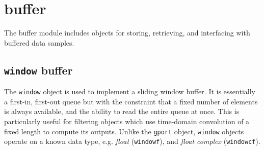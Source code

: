 % 
%

\newpage
\section{buffer}
\label{module:buffer}
The buffer module includes objects for storing, retrieving, and
interfacing with buffered data samples.


\subsection{{\tt window} buffer}
\label{module:buffer:window}
The {\tt window} object is used to implement a sliding window buffer.
It is essentially a first-in, first-out queue but with the constraint that a
fixed number of elements is always available, and the ability to read the
entire queue at once.
This is particularly useful for filtering objects which use time-domain
convolution of a fixed length to compute its outputs.
Unlike the {\tt gport} object, {\tt window} objects operate on a known data
type, e.g.
{\it float} ({\tt windowf}), and
{\it float complex} ({\tt windowcf}).

